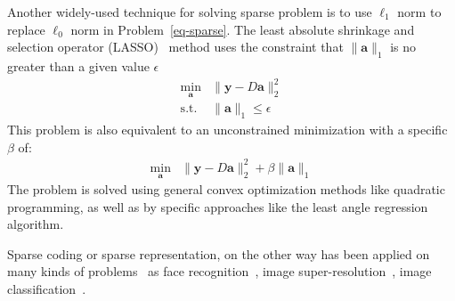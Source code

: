 Another widely-used technique for solving sparse problem is to use $\ell_1$ norm to replace $\ell_0$ norm in Problem~\ref{eq-sparse}.
The least absolute shrinkage and selection operator (LASSO)~\cite{tibshirani1996regression} method uses the constraint that $\|\mathbf{a}\|_1$ is no greater than a given value $\epsilon$
\begin{equation}
\begin{array}{cl}
\min_{\mathbf{a}} & \|\mathbf{y}-D\mathbf{a}\|_2^2\\
\mathrm{s.t.} & \|\mathbf{a}\|_1 \leq \epsilon
\end{array}
\end{equation}
This problem is also equivalent to an unconstrained minimization with a specific $\beta$ of:
\begin{equation}
\begin{array}{cl}
\min_{\mathbf{a}} & \|\mathbf{y}-D\mathbf{a}\|_2^2 + \beta \|\mathbf{a}\|_1
\end{array}
\end{equation}
The problem is solved using general convex optimization methods like quadratic programming, as well as by specific approaches like the least angle regression~\cite{efron2004least} algorithm.

Sparse coding or sparse representation, on the other way has been applied on many kinds of problems~\cite{wright2010sparse} as face recognition~\cite{wright2009robust}, image super-resolution~\cite{yang2008image}, image classification~\cite{mairal2008discriminative}.


